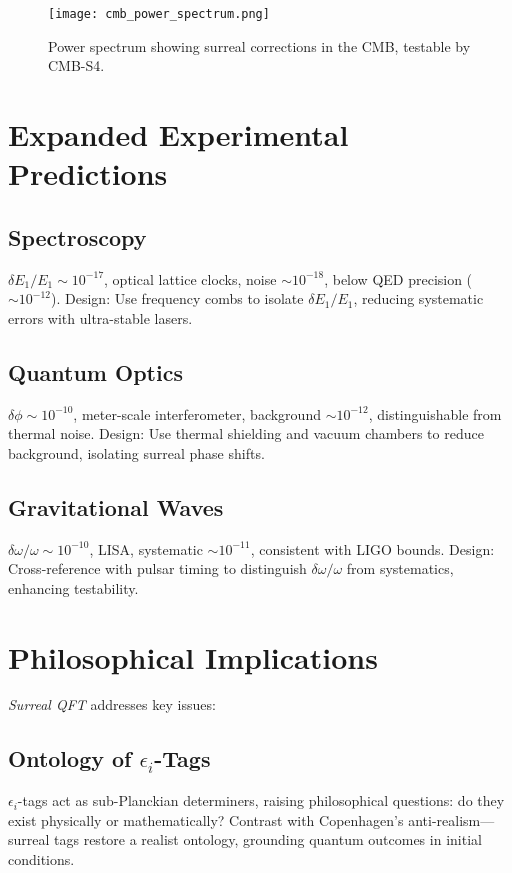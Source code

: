 \documentclass{article}
\begin{document}
\begin{figure}[h]
    \centering
    \texttt{[image: cmb\_power\_spectrum.png]}
    \caption{Power spectrum showing surreal corrections in the CMB, testable by CMB-S4.}
    \label{fig:cmb_spectrum}
\end{figure}

\section{Expanded Experimental Predictions}
\subsection{Spectroscopy}
\(\delta E_1 / E_1 \sim 10^{-17}\), optical lattice clocks, noise \(\sim 10^{-18}\), below QED precision (\(\sim 10^{-12}\)). Design: Use frequency combs to isolate \(\delta E_1 / E_1\), reducing systematic errors with ultra-stable lasers.

\subsection{Quantum Optics}
\(\delta \phi \sim 10^{-10}\), meter-scale interferometer, background \(\sim 10^{-12}\), distinguishable from thermal noise. Design: Use thermal shielding and vacuum chambers to reduce background, isolating surreal phase shifts.

\subsection{Gravitational Waves}
\(\delta \omega / \omega \sim 10^{-10}\), LISA, systematic \(\sim 10^{-11}\), consistent with LIGO bounds. Design: Cross-reference with pulsar timing to distinguish \(\delta \omega / \omega\) from systematics, enhancing testability.

\section{Philosophical Implications}
\textit{Surreal QFT} addresses key issues:
\subsection{Ontology of \(\epsilon_i\)-Tags}
\(\epsilon_i\)-tags act as sub-Planckian determiners, raising philosophical questions: do they exist physically or mathematically? Contrast with Copenhagen's anti-realism—surreal tags restore a realist ontology, grounding quantum outcomes in initial conditions.
\end{document}
